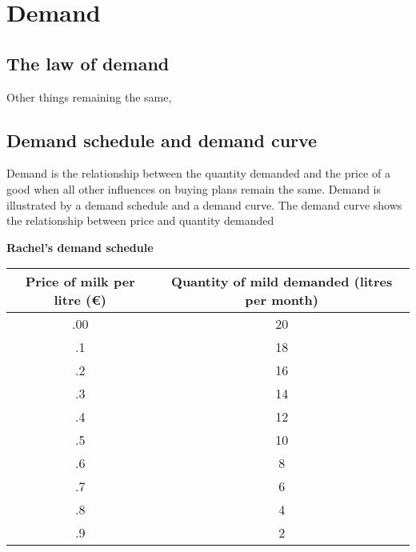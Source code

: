 \pbn
\section{Demand}

\subsection{The law of demand}
Other things remaining the same,

\pbn
{}

\pbn
\subsection{Demand schedule and demand curve}
Demand is the relationship between the quantity demanded and the price of a good when all other influences on buying plans remain the same. 
Demand is illustrated by a demand schedule and a demand curve.
The demand curve shows the relationship between price and quantity demanded

\textbf{Rachel's demand schedule}

	\begin{center}
		\begin{tabularx}{.5\textwidth}{CC}
			\toprule
			Price of milk per litre (\euro) & Quantity of mild demanded (litres per month) \\\midrule 
			.00&  20\\ 
			.1&18  \\  
			.2&16  \\  
			.3&  14\\  
			.4&  12\\  
			.5&  10\\  
			.6&  8\\  
			.7&  6\\  
			.8&  4\\
			.9& 2\\\bottomrule 
		\end{tabularx} 	
	\end{center}




